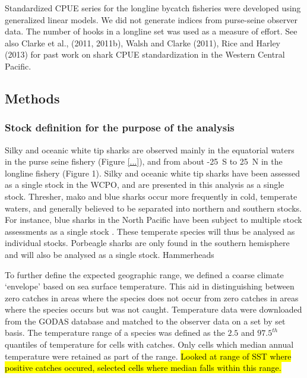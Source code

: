 Standardized CPUE series for the longline bycatch fisheries were developed using generalized linear models. We did not generate indices from purse-seine observer data. The number of hooks in a longline set was used as a measure of effort.
See also Clarke et al., (2011, 2011b),  Walsh and Clarke (2011), Rice and Harley (2013) for past work on shark CPUE standardization in the Western Central Pacific.
\subsection{Methods}
\subsubsection{Stock definition for the purpose of the analysis}

Silky and oceanic white tip sharks are observed mainly in the equatorial waters in the purse seine fishery (Figure \ref{...}), and from about -25\degree~S to 25\degree~N in the longline fishery (Figure 1). Silky and oceanic white tip sharks have been assessed \citep{Rice2012_a, Rice2013_a} as a single stock in the WCPO, and are presented in this analysis as a single stock.  Thresher, mako and blue sharks occur more frequently in cold, temperate waters, and generally believed to be separated into northern and southern stocks. For instance, blue sharks in the North Pacific have been subject to multiple stock assessments as a single stock \citep{XXXX}. These temperate species will thus be analysed as individual stocks. Porbeagle sharks are only found in the southern hemisphere and will also be analysed as a single stock. Hammerheads 

To further define the expected geographic range, we defined a coarse climate `envelope' based on sea surface temperature. This aid in distinguishing between zero catches in areas where the species does not occur from zero catches in areas where the species occurs but was not caught. Temperature data were downloaded from the GODAS database \citep{GODASXXXX_a} and matched to the observer data on a set by set basis. The temperature range of a species was defined as the $2.5$ and $97.5^{th}$ quantiles of temperature for cells with catches. Only cells which median annual temperature were retained as part of the range. 
\hl{Looked at range of SST where positive catches occured, selected cells where median falls within this range.}
